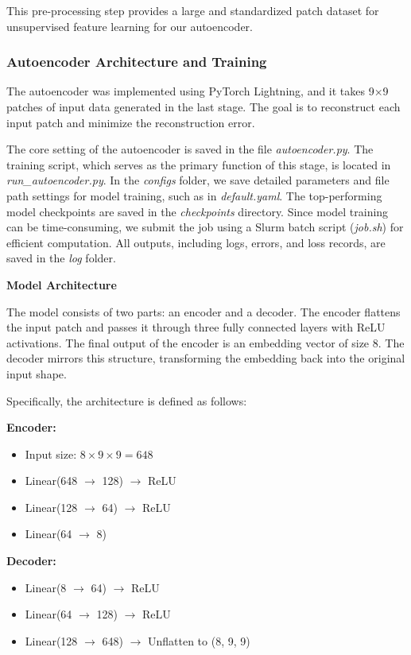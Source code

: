\documentclass[10pt,letterpaper]{article}
\begin{document}
This pre-processing step provides a large and standardized patch dataset for unsupervised feature learning for our autoencoder.

\subsubsection{Autoencoder Architecture and Training}

The autoencoder was implemented using PyTorch Lightning, and it takes 9×9 patches of input data generated in the last stage. The goal is to reconstruct each input patch and minimize the reconstruction error.

The core setting of the autoencoder is saved in the file \textit{autoencoder.py}. The training script, which serves as the primary function of this stage, is located in \textit{run\_autoencoder.py}. In the \textit{configs} folder, we save detailed parameters and file path settings for model training, such as in \textit{default.yaml}. The top-performing model checkpoints are saved in the \textit{checkpoints} directory. Since model training can be time-consuming, we submit the job using a Slurm batch script (\textit{job.sh}) for efficient computation. All outputs, including logs, errors, and loss records, are saved in the \textit{log} folder.


\textbf{Model Architecture}

The model consists of two parts: an encoder and a decoder. The encoder flattens the input patch and passes it through three fully connected layers with ReLU activations. The final output of the encoder is an embedding vector of size 8. The decoder mirrors this structure, transforming the embedding back into the original input shape.

Specifically, the architecture is defined as follows:

\textbf{Encoder:}

\begin{itemize}
    \item Input size: $8 \times 9 \times 9 = 648$
    \item Linear(648 $\rightarrow$ 128) $\rightarrow$ ReLU
    \item Linear(128 $\rightarrow$ 64) $\rightarrow$ ReLU
    \item Linear(64 $\rightarrow$ 8)
\end{itemize}


\textbf{Decoder:}

\begin{itemize}
    \item Linear(8 $\rightarrow$ 64) $\rightarrow$ ReLU
    \item Linear(64 $\rightarrow$ 128) $\rightarrow$ ReLU
    \item Linear(128 $\rightarrow$ 648) $\rightarrow$ Unflatten to (8, 9, 9)
\end{itemize}
\end{document}
